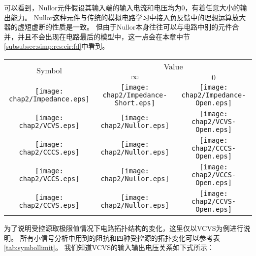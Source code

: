 可以看到，Nullor元件假设其输入端的输入电流和电压均为0，有着任意大小的输出能力。
Nullor这种元件与传统的模拟电路学习中接入负反馈中的理想运算放大器的虚短虚断的性质是一致。
但由于Nullor本身往往可以与电路中别的元件合并，并且不会出现在电路最后的模型中，这一点会在本章中节\ref{subsubsec:simp:res:cir:fd}中看到。

\begin{table}[!htbp]
	\centering
	\begin{tabular}{c|c|c}
		\hline
		\multirow{2}{*}{Symbol} & \multicolumn{2}{c}{Value}\\
		\cline{2-3} 
		& $\infty$ & $0$\\
		\hline
		\parbox[c]{0.11\textwidth}{\texttt{[image: chap2/Impedance.eps]}} & 
		\parbox[c]{0.11\textwidth}{\texttt{[image: chap2/Impedance-Short.eps]}} & 
		\parbox[c]{0.11\textwidth}{\texttt{[image: chap2/Impedance-Open.eps]}} \\
		\hline
		\parbox[c]{0.2\textwidth}{\texttt{[image: chap2/VCVS.eps]}} & 
		\parbox[c]{0.11\textwidth}{\texttt{[image: chap2/Nullor.eps]}} & 
		\parbox[c]{0.11\textwidth}{\texttt{[image: chap2/VCVS-Open.eps]}} \\
		\hline
		\parbox[c]{0.2\textwidth}{\texttt{[image: chap2/CCCS.eps]}} & 
		\parbox[c]{0.11\textwidth}{\texttt{[image: chap2/Nullor.eps]}} & 
		\parbox[c]{0.11\textwidth}{\texttt{[image: chap2/CCCS-Open.eps]}} \\
		\hline
		\parbox[c]{0.2\textwidth}{\texttt{[image: chap2/VCCS.eps]}} & 
		\parbox[c]{0.11\textwidth}{\texttt{[image: chap2/Nullor.eps]}} & 
		\parbox[c]{0.11\textwidth}{\texttt{[image: chap2/VCCS-Open.eps]}} \\
		\hline
		\parbox[c]{0.2\textwidth}{\texttt{[image: chap2/CCVS.eps]}} & 
		\parbox[c]{0.11\textwidth}{\texttt{[image: chap2/Nullor.eps]}} & 
		\parbox[c]{0.11\textwidth}{\texttt{[image: chap2/CCVS-Open.eps]}} \\
		\hline
	\end{tabular}
\end{table}

为了说明受控源取极限值情况下电路拓扑结构的变化，这里仅以VCVS为例进行说明。
所有小信号分析中用到的阻抗和四种受控源的拓扑变化可以参考表\ref{tab:symbollimit}。
我们知道VCVS的输入输出电压关系如下式所示：

